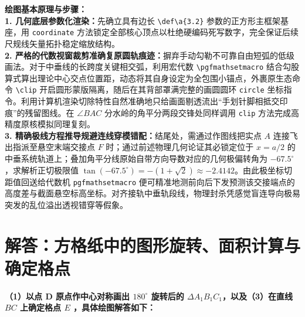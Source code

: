{\small\color{blue!70!black}
\textbf{绘图基本原理与步骤：}\\
\textbf{1. 几何底层参数化渲染：}先确立具有边长 \texttt{\textbackslash def\textbackslash a\{3.2\}} 参数的正方形主框架基座，用 \texttt{coordinate} 方法锁定全部核心顶点以杜绝硬编码死写数字，完全保证后续尺规线矢量拓扑稳定缩放结构。\\
\textbf{2. 严格的代数视窗裁剪准确复原圆轨痕迹：}摒弃手动勾勒不可靠自由短弧的低级画法。对于中垂线的长跨度关键相交弧，利用宏代数 \texttt{\textbackslash pgfmathsetmacro} 结合勾股算式算出理论中心交点位置距，动态将其自身设定为全包围小锚点，外裹原生态命令 \texttt{\textbackslash clip} 开启圆形蒙版隔离，随后在其背部罩满完整的画圆圆环 \texttt{circle} 坐标指令。利用计算机渲染切除特性自然准确地只给画面剔透流出“手划针脚相抵交印痕”的残留图线。在 $\angle BAC$ 分水岭的角平分两段交锋处同样调用 \texttt{clip} 方法完成高精度原核模拟同理复刻。\\
\textbf{3. 精确极线方程推导规避连线穿模错配：}结尾处，需通过作图线把实点 $A$ 连接飞出指派至悬空末端交接点 $F$ 时；通过前述物理几何论证其必锁定位于 $x=a/2$ 的中垂系统轨道上；叠加角平分线原始自带方向导数对应的几何极偏转角为 $-67.5^\circ$，求解析正切极限值 $\tan(-67.5^\circ) = -(1+\sqrt{2}) \approx -2.4142$。由此极坐标切距值回送给代数机 \texttt{pgfmathsetmacro} 便可精准地测前向后下发预测该交接端点的高度差与截面悬空标高坐标。对齐接轨中垂轨段线，物理封杀凭感觉盲连导向极易突发的乱位溢出透视错穿等假象。
}

\newpage

\newpage



\section{解答：方格纸中的图形旋转、面积计算与确定格点}

\vspace{0.6cm}

\textbf{（1）以点 D 原点作中心对称画出 $180^\circ$ 旋转后的 $\Delta A_1B_1C_1$，以及（3）在直线 $BC$ 上确定格点 $E$ ，具体绘图解答如下：}

\vspace{0.4cm}

